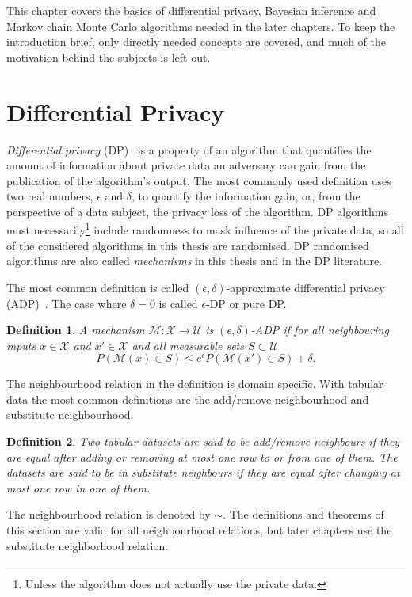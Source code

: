 \documentclass[english,twoside,openright]{HYgraduMLDS}
\newtheorem{definition}{Definition}
\newcommand{\calm}{{\mathcal{M}}}
\newcommand{\calx}{{\mathcal{X}}}
\newcommand{\calu}{{\mathcal{U}}}
\begin{document}
This chapter covers the basics of differential privacy, Bayesian inference
and Markov chain Monte Carlo algorithms needed in the later chapters. To keep
the introduction brief, only directly needed concepts are covered, and much
of the motivation behind the subjects is left out.

\section{Differential Privacy}\label{DP_background}
\emph{Differential privacy} (DP)~\cite{DMN06, DwR14} is a property of
an algorithm that quantifies the
amount of information about private data an adversary can gain from the 
publication of the algorithm's output.
The most commonly used definition uses two real numbers, 
\(\epsilon\) and \(\delta\), to quantify the information gain, or, from the 
perspective of a data subject, the privacy loss of the algorithm.
DP algorithms must necessarily\footnote{Unless the algorithm does not
actually use the private data.} include randomness to mask influence of the
private data, so all of the considered algorithms in this thesis are randomised.
DP randomised algorithms are also called \emph{mechanisms} in this thesis and in the
DP literature.

The most common definition is called \((\epsilon, \delta)\)-approximate
differential privacy (ADP)~\cite{DKM06, DwR14}.
The case where \(\delta = 0\) is called \(\epsilon\)-DP or 
pure DP.

\begin{definition}\label{ADP-definition}
    A mechanism \(\calm\colon \calx \to \calu\) is \((\epsilon, \delta)\)-ADP if
    for all neighbouring inputs \(x\in \calx\) and \(x'\in \calx\) and 
    all measurable sets \(S \subset \calu\)
    \[
        P(\calm(x)\in S) \leq e^\epsilon P(\calm(x')\in S) + \delta.
    \]
\end{definition}

The neighbourhood relation in the definition is domain specific. With tabular 
data the most common definitions are the add/remove neighbourhood and 
substitute neighbourhood.
\begin{definition}
    Two tabular datasets are said to be add/remove neighbours if they are equal 
    after adding or removing at most one row to or from one of them. The datasets 
    are said to be in substitute neighbours if they are equal after 
    changing at most one row in one of them.
\end{definition}
The neighbourhood relation is denoted by \(\sim\). The definitions and 
theorems of this section are valid for all neighbourhood relations, but later
chapters use the substitute neighborhood relation.
\end{document}
